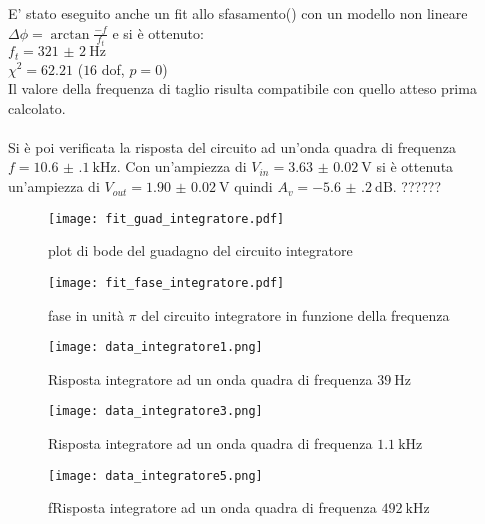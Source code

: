 E' stato eseguito anche un fit allo sfasamento() con un modello non lineare $\Delta \phi= \arctan{\frac{-f}{f_t}}$ e si è ottenuto:\\
$f_t= \SI{321(2)}{\Hz}$\\
$\chi^2=62.21$ ($16$ dof, $p = 0$)\\
Il valore della frequenza di taglio risulta compatibile con quello atteso prima calcolato.\\
\\
Si è poi verificata la risposta del circuito ad un'onda quadra di frequenza $f= \SI{10.6(1)}{\kHz}$. Con un'ampiezza di $V_{in}=\SI{3.63(2)}{\V}$ si è ottenuta un'ampiezza di $V_{out}=\SI{1.90(2)}{\V}$ quindi $A_v=\SI{-5.6(2)}{\dB}$.
??????





\begin{figure}[h]
	\centering
	\texttt{[image: fit\_guad\_integratore.pdf]}
	\caption{plot di bode del guadagno del circuito integratore}
	\label{f:guad_integ}
\end{figure}

\begin{figure}[h]
	\centering
	\texttt{[image: fit\_fase\_integratore.pdf]}
	\caption{fase in unità $\pi$ del circuito integratore in funzione della frequenza}
	\label{f:fase_integ}
\end{figure}

\begin{figure}[h]
	\centering
	\texttt{[image: data\_integratore1.png]}
	\caption{Risposta integratore ad un onda quadra di frequenza $\SI{39}{\Hz}$}
	\label{f:integ1}
\end{figure}

\begin{figure}[h]
	\centering
	\texttt{[image: data\_integratore3.png]}
	\caption{Risposta integratore ad un onda quadra di frequenza $\SI{1.1}{\kHz}$}
	\label{f:integ3}
\end{figure}	

\begin{figure}[h]
	\centering
	\texttt{[image: data\_integratore5.png]}
	\caption{fRisposta integratore ad un onda quadra di frequenza $\SI{492}{\kHz}$}
	\label{f:integ5}
\end{figure}